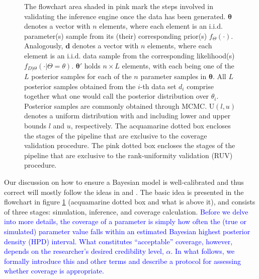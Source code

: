 \documentclass[oneside]{article}
\begin{document}
\begin{figure}
{    The flowchart area shaded in pink mark the steps involved in validating the inference engine once the data has been generated.
    $\boldsymbol{\theta}$ denotes a vector with $n$ elements, where each element is an i.i.d. parameter(s) sample from its (their) corresponding prior(s) $f_\Theta(\cdot)$.
    Analogously, $\boldsymbol{d}$ denotes a vector with $n$ elements, where each element is an i.i.d. data sample from the corresponding likelihood(s) $f_{D|\Theta}(\cdot|\Theta\mathop{=}\theta)$.
    $\boldsymbol{\theta}'$ holds $n \times L$ elements, with each being one of the $L$ posterior samples for each of the $n$ parameter samples in $\boldsymbol{\theta}$.
    All $L$ posterior samples obtained from the $i$-th data set $d_i$ comprise together what one would call the posterior distribution over $\theta_i$.
    Posterior samples are commonly obtained through MCMC.
    $\text{U}(l, u)$ denotes a uniform distribution with and including lower and upper bounds $l$ and $u$, respectively.
    The acquamarine dotted box encloses the stages of the pipeline that are exclusive to the coverage validation procedure.
    The pink dotted box encloses the stages of the pipeline that are exclusive to the rank-uniformity validation (RUV) procedure.}
\label{fig:flowchart}
\vspace{2cm}
\end{figure}

\vspace{.25cm}


Our discussion on how to ensure a Bayesian model is well-calibrated and thus correct will mostly follow the ideas in \citet{cook06}
and \citet{Talts2018}.
The basic idea is presented in the flowchart in figure \ref{fig:flowchart} (acquamarine dotted box and what is above it), and consists of three stages: simulation, inference, and coverage calculation.
\textcolor{blue}{Before we delve into more details, the coverage of a parameter is simply how often the (true or simulated) parameter value falls within an estimated Bayesian highest posterior density (HPD) interval.
What constitutes ``acceptable'' coverage, however, depends on the researcher's desired credibility level, $\alpha$.
In what follows, we formally introduce this and other terms and describe a protocol for assessing whether coverage is appropriate.}
\end{document}
